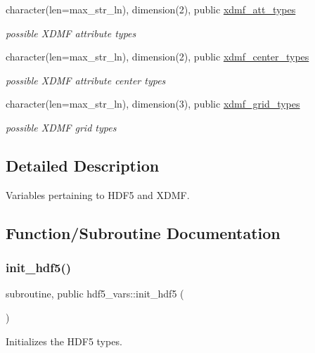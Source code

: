 \begin{DoxyCompactItemize}
character(len=max\+\_\+str\+\_\+ln), dimension(2), public \hyperlink{namespacehdf5__vars_a43c511f4b84cd716387c39c78b2cfe54}{xdmf\+\_\+att\+\_\+types}
\begin{DoxyCompactList}\small\item\em possible X\+D\+MF attribute types \end{DoxyCompactList}\item 
character(len=max\+\_\+str\+\_\+ln), dimension(2), public \hyperlink{namespacehdf5__vars_a7f20d570d2304c8e953646599bf61d73}{xdmf\+\_\+center\+\_\+types}
\begin{DoxyCompactList}\small\item\em possible X\+D\+MF attribute center types \end{DoxyCompactList}\item 
character(len=max\+\_\+str\+\_\+ln), dimension(3), public \hyperlink{namespacehdf5__vars_ab7b59b4afbcaff92aa1c236c23a4bf58}{xdmf\+\_\+grid\+\_\+types}
\begin{DoxyCompactList}\small\item\em possible X\+D\+MF grid types \end{DoxyCompactList}\end{DoxyCompactItemize}


\subsection{Detailed Description}
Variables pertaining to H\+D\+F5 and X\+D\+MF. 

\subsection{Function/\+Subroutine Documentation}
\mbox{\label{namespacehdf5__vars_ab644703bcb67ce423732e39ab56a4b63}} 
\subsubsection{\texorpdfstring{init\+\_\+hdf5()}{init\_hdf5()}}
{\footnotesize\ttfamily subroutine, public hdf5\+\_\+vars\+::init\+\_\+hdf5 (\begin{DoxyParamCaption}{ }\end{DoxyParamCaption})}



Initializes the H\+D\+F5 types. 


